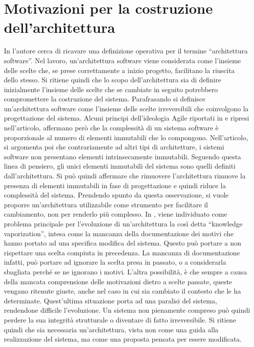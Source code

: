 \documentclass[12pt]{report}
\begin{document}
\section{Motivazioni per la costruzione dell'architettura}
In \cite{whoneedsanArchitect} l'autore cerca di ricavare una definizione operativa per il termine ``architettura software''. 
Nel lavoro, un'architettura software viene considerata come l'insieme delle scelte che, se prese correttamente a inizio progetto, facilitano la riuscita dello stesso.
Si ritiene quindi che lo scopo dell'architettura sia di definire inizialmente l'insieme delle scelte che se cambiate in seguito potrebbero compromettere la costruzione del sistema.
Parafrasando si definisce un'architettura software come l'insieme delle scelte irreversibili che coinvolgono la progettazione del sistema.
Alcuni principi dell'ideologia Agile riportati in \cite{martin_fowler_xp_2002} e ripresi nell'articolo, affermano però che la complessità di un sistema software è proporzionale al numero di elementi immutabili che lo compongono.
Nell'articolo, si argomenta poi che contrariamente ad altri tipi di architetture, i sistemi software non presentano elementi intrinsecamente immutabili. 
Seguendo questa linea di pensiero, gli unici elementi immutabili del sistema sono quelli definiti dall'architettura.
Si può quindi affermare che rimuovere l'architettura rimuove la presenza di elementi immutabili in fase di progettazione e quindi riduce la complessità del sistema.
Prendendo spunto da questa osservazione, si vuole proporre un'architettura utilizzabile come strumento per facilitare il cambiamento, non per renderlo più complesso. 
In \cite{designChoiche}, viene individuato come problema principale per l'evoluzione di un'architettura la così detta ``knowledge vaporization'', intesa come la mancanza della documentazione dei motivi che hanno portato ad una specifica modifica del sistema. 
Questo può portare a non rispettare una scelta compiuta in precedenza. 
La mancanza di documentazione infatti, può portare ad ignorare la scelta presa in passato, o a considerarla sbagliata perché se ne ignorano i motivi.  
L'altra possibilità, è che sempre a causa della mancata comprensione delle motivazioni dietro a scelte passate, queste vengano ritenute giuste, anche nel caso in cui sia cambiato il contesto che le ha determinate.
Quest'ultima situazione porta ad una paralisi del sistema, rendendone difficile l'evoluzione.
Un sistema non pienamente compreso può quindi perdere la sua integrità strutturale o diventare di fatto irreversibile.
Si ritiene quindi che sia necessaria un'architettura, vista non come una guida alla realizzazione del sistema, ma come una proposta pensata per essere modificata. 
\end{document}
